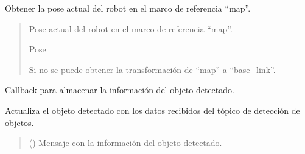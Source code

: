 \documentclass[a4paper,10pt,spanish]{sphinxmanual}
\begin{document}
\begin{fulllineitems}
\begin{fulllineitems}
\begin{quote}
\begin{description}
\end{description}\end{quote}

\end{fulllineitems}


\begin{fulllineitems}
\label{\detokenize{squad_approach_control_action:squad_approach_control_action.ApproachObjectActionServer.get_robot_pose}}
\pysigstartsignatures
{}
\pysigstopsignatures
\sphinxAtStartPar
Obtener la pose actual del robot en el marco de referencia “map”.
\begin{quote}\begin{description}
\sphinxAtStartPar
Pose actual del robot en el marco de referencia “map”.

\sphinxAtStartPar
Pose

\sphinxAtStartPar
{} \textendash{} Si no se puede obtener la transformación de “map” a “base\_link”.

\end{description}\end{quote}

\end{fulllineitems}


\begin{fulllineitems}
\label{\detokenize{squad_approach_control_action:squad_approach_control_action.ApproachObjectActionServer.object_callback}}
\pysigstartsignatures
{}
\pysigstopsignatures
\sphinxAtStartPar
Callback para almacenar la información del objeto detectado.

\sphinxAtStartPar
Actualiza el objeto detectado con los datos recibidos del tópico de detección de objetos.
\begin{quote}\begin{description}
\sphinxAtStartPar
{} () \textendash{} Mensaje con la información del objeto detectado.


\end{description}
\end{quote}
\end{fulllineitems}
\end{fulllineitems}
\end{document}
